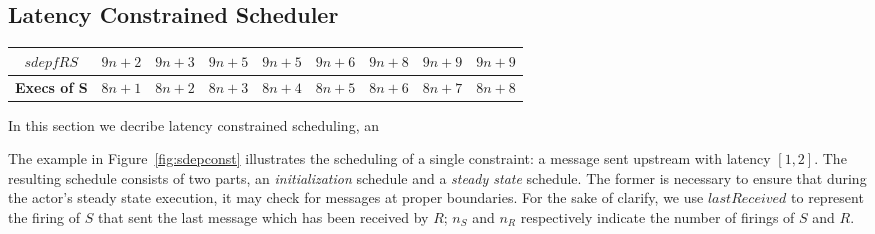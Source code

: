 \subsection{Latency Constrained Scheduler}

\begin{figure*}[t]
\begin{center}
\caption{{\small   Example   of    construction   of   a   constrained
schedule. The $\sdepf{R}{S}$ function for filters $R$ and $S$ is given
in  Table \ref{tab:sdepconst}. The  blob between  filters $R$  and $S$
illustrates other possible stream elements. $R$ sends a message to $S$
with  latency $[1,2]$.  Executions  of  the blob  are  omitted, it  is
assumed  that at the  point $S$  executes, the  blob has  drained data
provided by $R$.}}
\end{center}
\vspace{-12pt}
\label{fig:sdepconst}
\end{figure*}


\begin{table*}[t]
{\small
\begin{tabular}{|c|c|c|c|c|c|c|c|c|} \hline
{\bf $sdepf{R}{S}$} & $9n+2$ & $9n+3$  & $9n+5$  & $9n+5$ & $9n+6$ &
$9n+8$ & $9n+9$ & $9n+9$ \\ \hline
{\bf Execs of S} & $8n+1$ & $8n+2$ & $8n+3$ & $8n+4$ & $8n+5$ & $8n+6$ &
$8n+7$ & $8n+8$ \\ \hline
\end{tabular}}
\caption{\small $sdepf{R}{S}$ function for example in Figure \ref{fig:sdepconst}. This particular $\sdep$ function was obtained by setting $push_R=2$, $pop_S=3$ and making the blob between $R$ and $S$ into a filter that pops 3 and pushes 4 every iteration of its work function. No initialization due to peeking is necessary in this example.}
\label{tab:sdepconst}
\end{table*}

In this section we decribe latency constrained scheduling, an 

The example  in Figure~\ref{fig:sdepconst} illustrates  the scheduling
of a single constraint: a  message sent upstream with latency $[1,2]$.
The resulting schedule consists  of two parts, an {\it initialization}
schedule and a  {\it steady state} schedule.  The  former is necessary
to ensure that during the actor's steady state execution, it may check
for messages  at proper boundaries.  For  the sake of  clarify, we use
$lastReceived$  to represent  the firing  of  $S$ that  sent the  last
message which has been  received by $R$; $n_S$ and  $n_R$ respectively indicate
the number of firings of $S$ and $R$.

